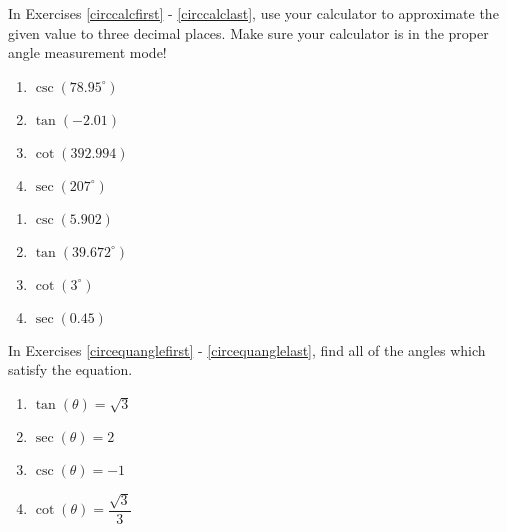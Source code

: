 \documentclass{ximera}
\begin{document}
\pagebreak

In Exercises \ref{circcalcfirst} - \ref{circcalclast}, use your calculator to approximate the given value to three decimal places.  Make sure your calculator is in the proper angle measurement mode!

\begin{multicols}{4}

\begin{enumerate}

\setcounter{enumi}{\value{HW}}

\item $\csc(78.95^{\circ})$ \label{circcalcfirst}
\item $\tan(-2.01)$
\item $\cot(392.994)$
\item $\sec(207^{\circ})$

\setcounter{HW}{\value{enumi}}

\end{enumerate}

\end{multicols}

\begin{multicols}{4}

\begin{enumerate}

\setcounter{enumi}{\value{HW}}

\item $\csc(5.902)$
\item $\tan(39.672^{\circ})$
\item $\cot(3^{\circ})$
\item $\sec(0.45)$ \label{circcalclast}

\setcounter{HW}{\value{enumi}}

\end{enumerate}

\end{multicols}


In Exercises \ref{circequanglefirst} - \ref{circequanglelast}, find all of the angles which satisfy the equation.

\begin{multicols}{4}

\begin{enumerate}

\setcounter{enumi}{\value{HW}}

\item $\tan(\theta) = \sqrt{3}$  \label{circequanglefirst}
\item $\sec(\theta) = 2$ 
\item $\csc(\theta) = -1$ 
\item $\cot(\theta) = \dfrac{\sqrt{3}}{3}$

\setcounter{HW}{\value{enumi}}

\end{enumerate}

\end{multicols}
\end{document}
